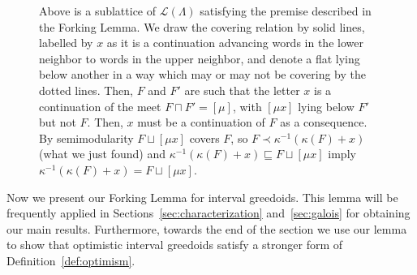 \documentclass[11pt]{article}
\newcommand{\glang}{\Lambda}
\providecommand{\L}{}
\renewcommand{\L}{\mathscr{L}}
\begin{document}
\begin{figure}[t!]
\fi

    \caption{Above is a sublattice of $\L(\glang)$ satisfying the premise described in the Forking Lemma. We draw the covering relation by solid lines, labelled by $x$ as it is a continuation advancing words in the lower neighbor to words in the upper neighbor, and denote a flat lying below another in a way which may or may not be covering by the dotted lines. Then, $F$ and $F'$ are such that the letter $x$ is a continuation of the meet $F\sqcap F' = [\mu]$, with $[\mu x]$ lying below $F'$ but not $F$. Then, $x$ must be a continuation of $F$ as a consequence. By semimodularity $F \sqcup [\mu x]$ covers $F$, so $F \prec \kappa^{-1}(\kappa(F) + x)$ (what we just found) and $\kappa^{-1}(\kappa(F) + x) \sqsubseteq F\sqcup [\mu x]$ imply $\kappa^{-1}(\kappa(F) + x) = F\sqcup [\mu x]$.}\label{fig:forking}
\end{figure}


Now we present our Forking Lemma for interval greedoids.
This lemma will be frequently applied in Sections~\ref{sec:characterization} and~\ref{sec:galois} for obtaining our main results.
Furthermore, towards the end of the section we use our lemma to show that optimistic interval greedoids satisfy a stronger form of Definition~\ref{def:optimism}.
\end{document}
